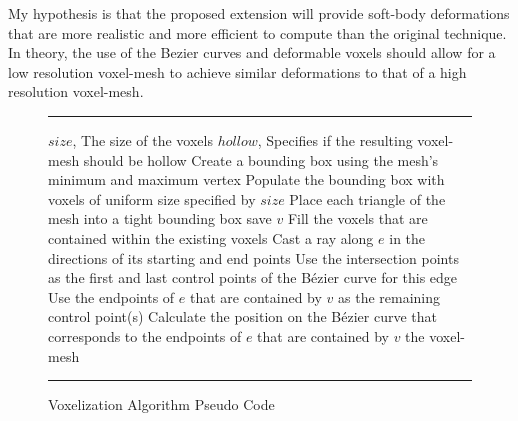 
My hypothesis is that the proposed extension will provide soft-body deformations that are more
realistic and more efficient to compute than the original technique. In theory, the use of the
Bezier curves and deformable voxels should allow for a low resolution voxel-mesh to achieve similar
deformations to that of a high resolution voxel-mesh.

\begin{figure}
  \hrule
  \vspace{6pt}
  \begin{algorithmic}
  \REQUIRE $size$, The size of the voxels
  \REQUIRE $hollow$, Specifies if the resulting voxel-mesh should be hollow
  \STATE Create a bounding box using the mesh's minimum and maximum vertex
  \STATE Populate the bounding box with voxels of uniform size specified by $size$
  \STATE Place each triangle of the mesh into a tight bounding box
          \STATE save $v$
      \ENDIF
  \ENDFOR
          \STATE Fill the voxels that are contained within the existing voxels
      \ENDFOR
  \ENDIF
          \STATE Cast a ray along $e$ in the directions of its starting and end points
          \STATE Use the intersection points as the first and last control points of the Bézier curve for this edge
          \STATE Use the endpoints of $e$ that are contained by $v$ as the remaining control point(s)
          \STATE Calculate the position on the Bézier curve that corresponds to the endpoints of $e$ that are contained by $v$
      \ENDFOR
  \ENDFOR
  \RETURN the voxel-mesh
  \end{algorithmic}
  \hrule
  \vspace{6pt}
  \caption{Voxelization Algorithm Pseudo Code}
 \label{fig:VoxelizationAlgorithm}
\end{figure}


